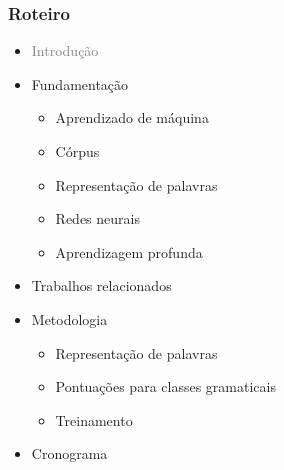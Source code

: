 \documentclass[10pt]{beamer}
\begin{document}
\begin{frame}
  \frametitle{Roteiro}


  \begin{itemize}

  \vspace{-1em}

    
    \item[\color{gray}{$\bullet$}] \textcolor{gray}{Introdução}
    
    \begin{itemize}
    \end{itemize}


    
    \item Fundamentação

    \begin{itemize}
      \item[\ ] Aprendizado de máquina
      \item[\ ] Córpus
      \item[\ ] Representação de palavras
      \item[\ ] Redes neurais
      \item[\ ] Aprendizagem profunda
    \end{itemize}


    \color{gray}
    \item[\color{gray}{$\bullet$}] Trabalhos relacionados

    \color{gray}
    \item[\color{gray}{$\bullet$}] Metodologia

    \begin{itemize}
      \color{gray}
      \item[\ ] Representação de palavras
      \item[\ ] Pontuações para classes gramaticais
      \item[\ ] Treinamento
    \end{itemize}

    \color{gray}
    \item[\color{gray}{$\bullet$}] Cronograma

  \end{itemize}

\end{frame}
\end{document}
